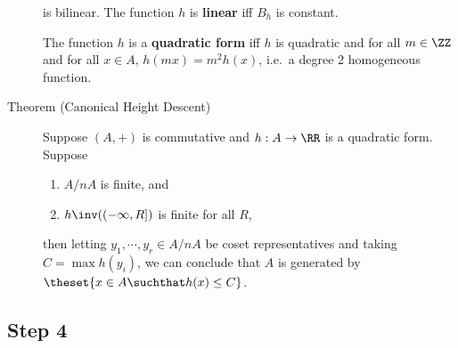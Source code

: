 \begin{description}
is bilinear. The function \(h\) is \textbf{linear} iff \(B_h\) is
constant.

The function \(h\) is a \textbf{quadratic form} iff \(h\) is quadratic
and for all \(m\in \ZZ\) and for all \(x\in A\), \(h(mx) = m^2 h(x)\),
i.e.~a degree 2 homogeneous function.
\item[Theorem (Canonical Height Descent)]
Suppose \((A, +)\) is commutative and \(h: A\to \RR\) is a quadratic
form. Suppose

\begin{enumerate}
\def\labelenumi{\arabic{enumi}.}
\tightlist
\item
  \(A/nA\) is finite, and
\item
  \(h\inv((-\infty, R])\) is finite for all \(R\),
\end{enumerate}

then letting \(y_1, \cdots, y_r \in A/nA\) be coset representatives and
taking \(C = \max h(y_i)\), we can conclude that \(A\) is generated by
\(\theset{x\in A \suchthat h(x) \leq C}\).
\end{description}

\hypertarget{step-4}{%
\subsection{Step 4}\label{step-4}}

